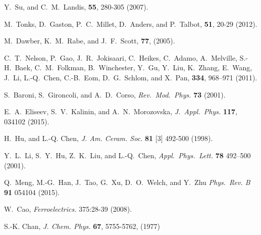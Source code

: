 \documentclass[22pt]{article} %
\begin{document}
\begin{thebibliography}{1}
Y.~Su, and C.~M.~Landis,
 \textbf{55}, 280-305 (2007).

M.~Tonks, D.~Gaston, P.~C.~Millet, D.~Anders, and P.~Talbot,
 \textbf{51}, 20-29 (2012).

M.~Dawber, K.~M.~Rabe, and J.~F.~Scott,
 \textbf{77}, (2005).

C.~T.~Nelson, P.~Gao, J.~R.~Jokisaari, C.~Heikes, C.~Adamo, A.~Melville, S.-H.~Baek, C.~M.~Folkman, B.~Winchester, Y.~Gu, Y.~Liu, K.~Zhang, 
E.~Wang, J.~Li, L.-Q.~Chen, C.-B.~Eom, D.~G.~Schlom, and X.~Pan,
 \textbf{334}, 968--971 (2011).

S.~Baroni, S.~Gironcoli, and A.~D.~Corso,
\newblock \emph{Rev.~Mod.~Phys.} \textbf{73} (2001).

E.~A.~Eliseev, S.~V.~Kalinin, and A.~N.~Morozovska,
\newblock \emph{J.~Appl.~Phys.} \textbf{117}, 034102 (2015).

H.~Hu, and L.-Q. Chen,
\newblock \emph{J. Am. Ceram. Soc.} \textbf{81} [3] 492-500 (1998).

Y.~L.~Li, S.~Y.~Hu, Z.~K.~Liu, and L.-Q.~Chen,
\newblock \emph{Appl.~Phys.~Lett.} \textbf{78} 492--500 (2001).

Q.~Meng, M.-G.~Han, J.~Tao, G.~Xu, D.~O.~Welch, and Y.~Zhu
\newblock \emph{Phys.~Rev. B} \textbf{91} 054104 (2015).

W.~Cao,
\newblock \emph{Ferroelectrics.} 375:28-39 (2008).

S.-K. Chan,
\newblock \emph{J. Chem. Phys.} \textbf{67}, 5755-5762, (1977)


\end{thebibliography}
\end{document}
